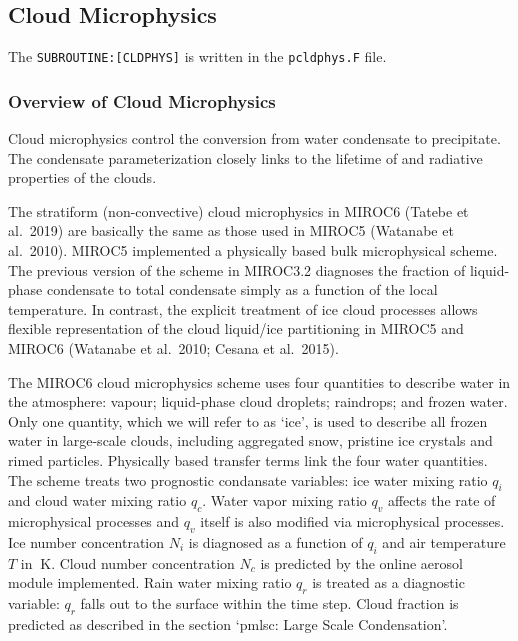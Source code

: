 \hypertarget{cloud-microphysics}{%
\subsection{Cloud Microphysics}\label{cloud-microphysics}}

The \texttt{SUBROUTINE:{[}CLDPHYS{]}} is written in the
\texttt{pcldphys.F} file.

\hypertarget{overview-of-cloud-microphysics}{%
\subsubsection{Overview of Cloud
Microphysics}\label{overview-of-cloud-microphysics}}

Cloud microphysics control the conversion from water condensate to
precipitate. The condensate parameterization closely links to the
lifetime of and radiative properties of the clouds.

The stratiform (non-convective) cloud microphysics in MIROC6 (Tatebe et
al.~2019) are basically the same as those used in MIROC5 (Watanabe et
al.~2010). MIROC5 implemented a physically based bulk microphysical
scheme. The previous version of the scheme in MIROC3.2 diagnoses the
fraction of liquid-phase condensate to total condensate simply as a
function of the local temperature. In contrast, the explicit treatment
of ice cloud processes allows flexible representation of the cloud
liquid/ice partitioning in MIROC5 and MIROC6 (Watanabe et al.~2010;
Cesana et al.~2015).

The MIROC6 cloud microphysics scheme uses four quantities to describe
water in the atmosphere: vapour; liquid-phase cloud droplets; raindrops;
and frozen water. Only one quantity, which we will refer to as `ice', is
used to describe all frozen water in large-scale clouds, including
aggregated snow, pristine ice crystals and rimed particles. Physically
based transfer terms link the four water quantities. The scheme treats
two prognostic condansate variables: ice water mixing ratio \(q_i\) and
cloud water mixing ratio \(q_c\). Water vapor mixing ratio \(q_v\)
affects the rate of microphysical processes and \(q_v\) itself is also
modified via microphysical processes. Ice number concentration \(N_i\)
is diagnosed as a function of \(q_i\) and air temperature \(T\) in
\(\mathrm{~K}\). Cloud number concentration \(N_c\) is predicted by the
online aerosol module implemented. Rain water mixing ratio \(q_r\) is
treated as a diagnostic variable: \(q_r\) falls out to the surface
within the time step. Cloud fraction is predicted as described in the
section `pmlsc: Large Scale Condensation'.

